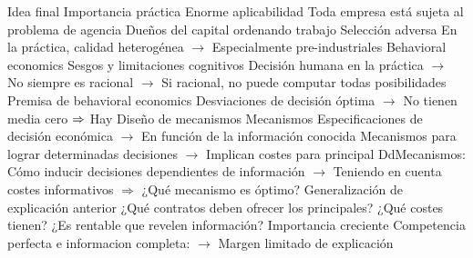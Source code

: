 \documentclass{nuevotema}
\begin{document}
\begin{esquemal}
		\2 Idea final
			\3 Importancia práctica
				\4 Enorme aplicabilidad
				\4 Toda empresa está sujeta al problema de agencia
				\4[] Dueños del capital ordenando trabajo
				\4 Selección adversa
				\4[] En la práctica, calidad heterogénea
				\4[] $\to$ Especialmente pre-industriales
			\3 Behavioral economics
				\4 Sesgos y limitaciones cognitivos
				\4[] Decisión humana en la práctica
				\4[] $\to$ No siempre es racional
				\4[] $\to$ Si racional, no puede computar todas posibilidades
				\4 Premisa de behavioral economics
				\4[] Desviaciones de decisión óptima
				\4[] $\to$ No tienen media cero
				\4[] $\Rightarrow$ Hay
			\3 Diseño de mecanismos
				\4 Mecanismos
				\4[] Especificaciones de decisión económica
				\4[] $\to$ En función de la información conocida
				\4[] Mecanismos para lograr determinadas decisiones
				\4[] $\to$ Implican costes para principal
				\4 DdMecanismos:
				\4[] Cómo inducir decisiones dependientes de información
				\4[] $\to$ Teniendo en cuenta costes informativos
				\4[] $\Rightarrow$ ¿Qué mecanismo es óptimo?
				\4 Generalización de explicación anterior
				\4[] ¿Qué contratos deben ofrecer los principales?
				\4[] ¿Qué costes tienen?
				\4[] ¿Es rentable que revelen información?
				\4 Importancia creciente
				\4[] Competencia perfecta e informacion completa:
				\4[] $\to$ Margen limitado de explicación
\end{esquemal}

























\graficas
\end{document}
